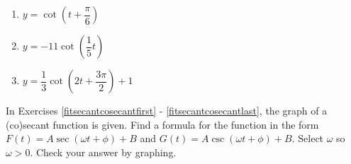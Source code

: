 \documentclass{ximera}
\begin{document}
\begin{multicols}{3}

\begin{enumerate}

\setcounter{enumi}{\value{HW}}

\item $y = \cot \left( t + \dfrac{\pi}{6} \right)$  
\item $y = -11\cot \left( \dfrac{1}{5} t \right)$
\item $y = \dfrac{1}{3} \cot \left( 2t + \dfrac{3\pi}{2} \right) + 1$ \label{othergraphslast}

\setcounter{HW}{\value{enumi}}

\end{enumerate}

\end{multicols}

In Exercises \ref{fitsecantcosecantfirst} - \ref{fitsecantcosecantlast},  the graph of a (co)secant function is given. Find a formula for the function in the form $F(t) = A \sec(\omega t + \phi) + B$ and $G(t) = A \csc(\omega t + \phi) + B$.  Select $\omega$ so  $\omega > 0$. Check your answer by graphing.
\end{document}
